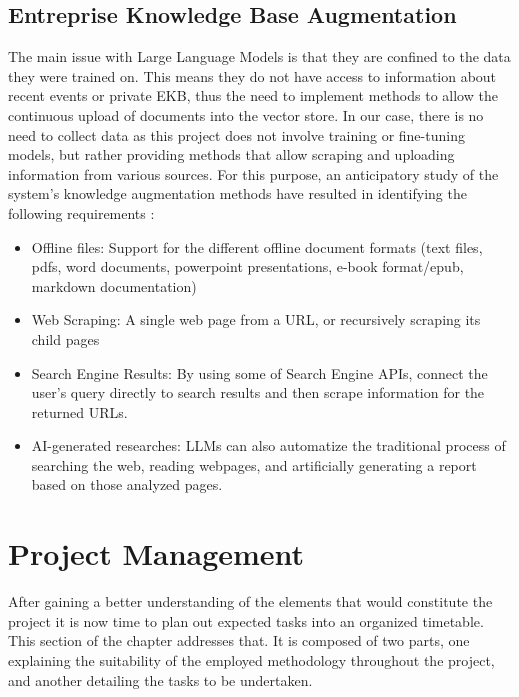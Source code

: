 \subsection{Entreprise Knowledge Base Augmentation}
The main issue with Large Language Models is that they are confined to the data they were trained on. This means they do not have access to information about recent events or private EKB, thus the need to implement methods to allow the continuous upload of documents into the vector store.\newline
In our case, there is no need to collect data as this project does not involve training or fine-tuning models, but rather providing methods that allow scraping and uploading information from various sources.\newline
For this purpose, an anticipatory study of the system's knowledge augmentation methods have resulted in identifying the following requirements :
\begin{itemize}
    \item Offline files: Support for the different offline document formats (text files, pdfs, word documents, powerpoint presentations, e-book format/epub, markdown documentation)
    \item Web Scraping: A single web page from a URL, or recursively scraping its child pages
    \item Search Engine Results: By using some of Search Engine APIs, connect the user's query directly to search results and then scrape information for the returned URLs.
    \item AI-generated researches: LLMs can also automatize the traditional process of searching the web, reading webpages, and artificially generating a report based on those analyzed pages.
\end{itemize}
\newpage

\section{Project Management}
After gaining a better understanding of the elements that would constitute the project it is now time to plan out expected tasks into an organized timetable. This section of the chapter addresses that. It is composed of two parts, one explaining the suitability of the employed methodology throughout the project, and another detailing the tasks to be undertaken.
